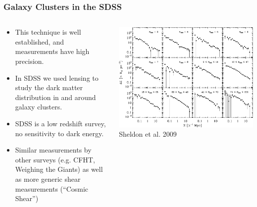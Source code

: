 \documentclass{beamer}
\begin{document}
\frame
{
    \frametitle{Galaxy Clusters in the SDSS}
    \fontsize{10}{0.8\baselineskip}

    \begin{columns}
        \begin{column}{0.5\textwidth}
            \begin{itemize}

                \item This technique is well established, and measurements have high precision.

                \item In SDSS we used lensing to study the dark matter distribution in
                    and around galaxy clusters.

                \item SDSS is a low redshift survey, no sensitivity to dark energy.

                \item Similar measurements by other surveys (e.g. CFHT, Weighing the Giants)
                    as well as more generic shear measurements (``Cosmic Shear'')

            \end{itemize}
        \end{column}

        \begin{column}{0.5\textwidth}
            \begin{center}
                \includegraphics[width=\textwidth]{maxbcg_sample21-22_ngals200_12_jackknife.pdf}
                \newline
                Sheldon et al. 2009
            \end{center}
        \end{column}
    \end{columns}
}
\end{document}
